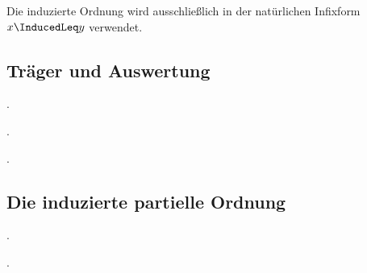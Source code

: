 \documentclass[main.tex]{subfiles}
\begin{document}
\begin{remark}
Die induzierte Ordnung wird ausschließlich in der natürlichen Infixform
\(x\InducedLeq y\) verwendet.
\end{remark}

\subsection{Träger und Auswertung}

\par\noindent\begin{minipage}{\linewidth}
\par\noindent{}.\par
\end{minipage}\par


\par\noindent\begin{minipage}{\linewidth}
\par\noindent{}.\par
\end{minipage}\par


\par\noindent\begin{minipage}{\linewidth}
\par\noindent{}.\par
\end{minipage}\par


\subsection{Die induzierte partielle Ordnung}

\par\noindent\begin{minipage}{\linewidth}
\par\noindent{}.\par
\end{minipage}\par


\par\noindent\begin{minipage}{\linewidth}
\par\noindent{}.\par
\end{minipage}\par
\end{document}
